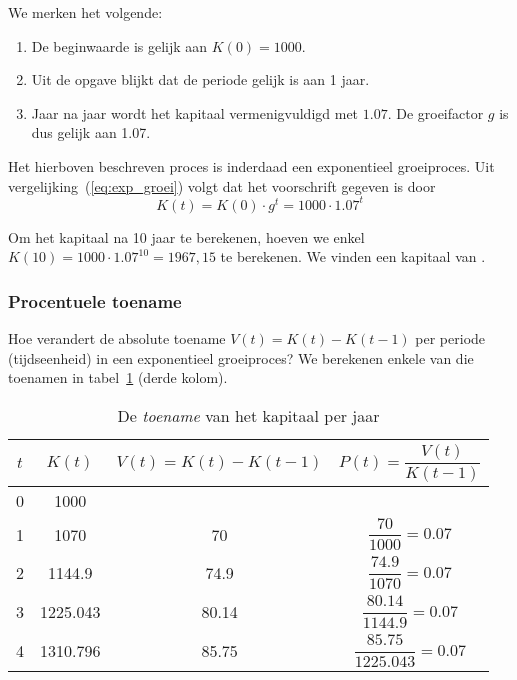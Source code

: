 We merken het volgende:
\begin{enumerate}
\item De beginwaarde is gelijk aan $K(0)=1000$.
\item Uit de opgave blijkt dat de periode gelijk is aan 1 jaar.
\item Jaar na jaar wordt het kapitaal vermenigvuldigd met $\num{1.07}$. De groeifactor $g$ is dus gelijk aan \num{1.07}.
\end{enumerate}
Het hierboven beschreven proces is inderdaad een exponentieel groeiproces. Uit vergelijking~(\ref{eq:exp_groei}) volgt dat het voorschrift gegeven is door 
\begin{equation}
     K(t)=K(0)\cdot g^{t}=1000\cdot \num{1.07}^{t}
    \label{eq:si}
\end{equation}

Om het kapitaal na 10 jaar te berekenen, hoeven we enkel $K(10)=1000\cdot \num{1.07}^{10}=1967,15$ te berekenen. We vinden een kapitaal van .

\subsubsection{Procentuele toename}
Hoe verandert de absolute toename $V(t)=K(t)-K(t-1)$ per periode (tijdseenheid) in een
exponentieel groeiproces?  We berekenen enkele van die toenamen in
tabel~\ref{tbl:samgesint} (derde kolom). 
\begin{table}[htb]
    \centering
    \caption{De \emph{toename} van het kapitaal per jaar}
    \begin{tabular}{cccc}
     \toprule
    $t$ & $K(t)$ & $V(t)=K(t)-K(t-1)$  & $ P(t)=\dfrac{V(t)}{K(t-1)}$\\
    \midrule
    0 & 1000 &   &\\

    1 & 1070 & 70&$\dfrac{70}{1000}=\num{0.07}$   \\[10pt]

    2 & \num{1144,9} & \num{74,9} & $\dfrac{\num{74.9}}{1070}=\num{0.07}$  \\[10pt]

    3 & \num{1225,043} & \num{80,14} &$\dfrac{\num{80.14}}{\num{1144.9}}=\num{0.07}$ \\[10pt]

    4 & \num{1310,796} & \num{85,75}  & $\dfrac{\num{85,75}}{\num{1225,043}}=\num{0.07}$\\
    \bottomrule
\end{tabular}
    \label{tbl:samgesint}
\end{table}

